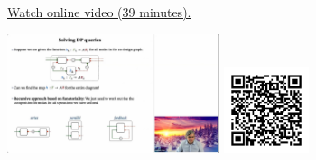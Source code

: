 
\begin{minipage}{10cm}
    \href{https://act4e-spring21.netlify.app/videos/spring2021-functorial-comp-b:solving-queries.html}{Watch online video (39 minutes).}
        
    \href{https://act4e-spring21.netlify.app/videos/spring2021-functorial-comp-b:solving-queries.html}{\includegraphics[height=3.5cm]{spring2021-functorial-comp-b:solving-queries/thumbnails.jpg}}
    \href{https://act4e-spring21.netlify.app/videos/spring2021-functorial-comp-b:solving-queries.html}{\includegraphics[height=2.5cm]{spring2021-functorial-comp-b:solving-queries/qrcode.png}}
\end{minipage}
